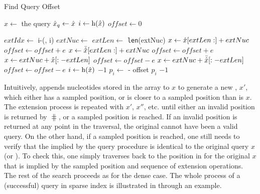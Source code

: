   \begin{algorithm}
    \caption{Find Query Offset}\label{alg:nextSample}
    \begin{algorithmic}
      \State $x \gets$ the query \kmer
      \State $\hat{x}_{q} \gets \hat{x}$
      \State $i \gets \operatorname{h}(\hat{x})$
      \State $offset \gets 0$

      \State $extIdx \gets$ i-\rank(\sampvec, i)
      \State $extNuc \gets$ \qextvec[extIdx]
      \State $extLen \gets$ \texttt{len}(extNuc)
      \State $x \gets \hat{x}[extLen:] + extNuc$
      \State $offset \gets offset + e$
      \EndIf
      \State $x \gets \bar{\hat{x}}[extLen:] + extNuc$
      \State $offset \gets offset + e$
      \EndIf
      \State $x \gets extNuc + \hat{x}[:-extLen]$
      \State $offset \gets offset - e$
      \EndIf
      \State $x \gets extNuc + \bar{\hat{x}}[:-extLen]$
      \State $offset \gets offset - e$
      \EndIf
      \State $i \gets \operatorname{h}(\hat{x})$
      \EndWhile
      \Return $-1$
      \EndIf
      \State $p_i \gets $  - offset
      \State\Return $p_i$
      \Else
      \State\Return $-1$
      \EndIf
      \EndProcedure
    \end{algorithmic}
  \end{algorithm}

  Intuitively,  appends nucleotides stored in the \qextvec
  array to $x$ to generate a new \kmer, $x'$, which either has a sampled position,
  or is closer to a sampled position than is $x$. The extension process is
  repeated with $x'$, $x''$, etc. until either an invalid position is returned by
  $\hash$, or a sampled position is reached. If an invalid position is returned at
  any point in the traversal, the original \kmer cannot have been a valid query.
  On the other hand, if a sampled position is reached, one still needs to verify
  that the \kmer implied by the query procedure is identical to the original \kmer
  query $x$ (or ). To check this, one simply traverses back to the position
  in \cseq for the original \kmer $x$ that is implied by the sampled position and
  sequence of extension operations. The rest of the search proceeds as for the
  dense case. The whole process of a (successful) \kmer query in sparse index is
  illustrated in  through an example.


